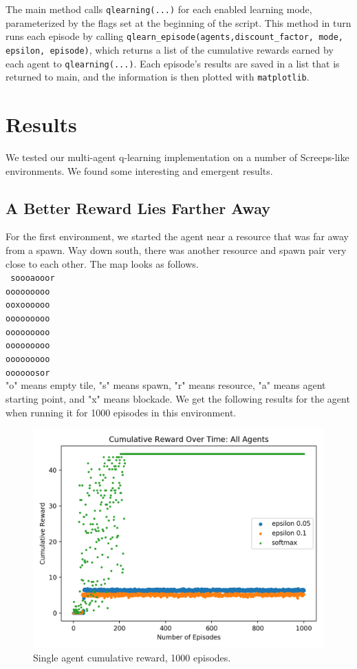 \documentclass[11pt]{article}
\begin{document}
The main method calls \texttt{qlearning(...)} for each enabled learning mode, parameterized by the flags set at the beginning of the script. This method in turn runs each episode by calling \texttt{qlearn_episode(agents,discount_factor, mode, epsilon, episode)}, which returns a list of the cumulative rewards earned by each agent to \texttt{qlearning(...)}. Each episode's results are saved in a list that is returned to main, and the information is then plotted with \texttt{matplotlib}.  


\section{Results}

We tested our multi-agent q-learning implementation on a number of Screeps-like environments. We found some interesting and emergent results.

\subsection{A Better Reward Lies Farther Away}

For the first environment, we started the agent near a resource that was far away from a spawn. Way down south, there was another resource and spawn pair very close to each other. The map looks as follows.\\
\texttt{
soooaooor\\
ooooooooo\\
ooxoooooo\\
ooooooooo\\
ooooooooo\\
ooooooooo\\
ooooooooo\\
oooooosor\\
}
"o" means empty tile, "s" means spawn, "r" means resource, "a" means agent starting point, and "x" means blockade. We get the following results for the agent when running it for 1000 episodes in this environment.\\

\begin{figure}[H]
  \centering
\includegraphics[width=.7\textwidth]{ai-env1.png}
\caption{Single agent cumulative reward, 1000 episodes.}
\end{figure}
\end{document}
